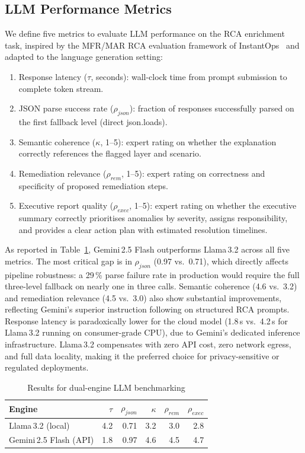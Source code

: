 \documentclass[5p, times]{elsarticle}
\begin{document}
\subsection{LLM Performance Metrics}
We define five metrics to evaluate LLM performance on the RCA enrichment task, inspired by the MFR/MAR RCA evaluation framework of InstantOps~\cite{instantops2024} and adapted to the language generation setting:
\begin{enumerate}[leftmargin=*, topsep=2pt, itemsep=1pt]
    \item Response latency ($\tau$, seconds): wall-clock time from prompt submission to complete token stream.
    \item JSON parse success rate ($\rho_{json}$): fraction of responses successfully parsed on the first fallback
    level (direct json.loads).
    \item Semantic coherence ($\kappa$, 1--5): expert
    rating on whether the explanation correctly references the flagged layer and scenario.
    \item Remediation relevance ($\rho_{rem}$, 1--5): expert rating on correctness and specificity of proposed remediation steps.
    \item Executive report quality ($\rho_{exec}$,
    1--5): expert rating on whether the executive summary correctly prioritises anomalies by severity, assigns responsibility, and provides a clear action plan with estimated resolution timelines.
\end{enumerate}

As reported in Table~\ref{tab:llm_bench}, Gemini\,2.5 Flash outperforms Llama\,3.2 across all five metrics. The most critical gap is in $\rho_{json}$ (0.97 vs.\ 0.71), which directly
affects pipeline robustness: a 29\,\% parse failure rate in production would require the full three-level fallback on nearly one in three calls. Semantic coherence (4.6 vs.\ 3.2) and remediation relevance (4.5 vs.\ 3.0) also show substantial
improvements, reflecting Gemini's superior instruction following on structured RCA prompts. Response latency is paradoxically lower for the cloud model (1.8\,s vs.\ 4.2\,s for Llama\,3.2 running on consumer-grade CPU), due to Gemini's dedicated inference infrastructure. Llama\,3.2 compensates with zero API cost, zero network egress, and full data locality, making it the preferred
choice for privacy-sensitive or regulated deployments.

\begin{table}[h!]
\centering
\caption{Results for dual-engine LLM benchmarking}
\label{tab:llm_bench}
\begin{tabular}{@{}lrrrrr@{}}
\toprule
\textbf{Engine} & $\tau$ & $\rho_{json}$ & $\kappa$ & $\rho_{rem}$ & $\rho_{exec}$ \\ \midrule
Llama\,3.2 (local)      & 4.2 & 0.71 & 3.2 & 3.0 & 2.8 \\
Gemini\,2.5 Flash (API) & 1.8 & 0.97 & 4.6
    & 4.5 & 4.7 \\ \bottomrule
\end{tabular}
\end{table}
\end{document}
